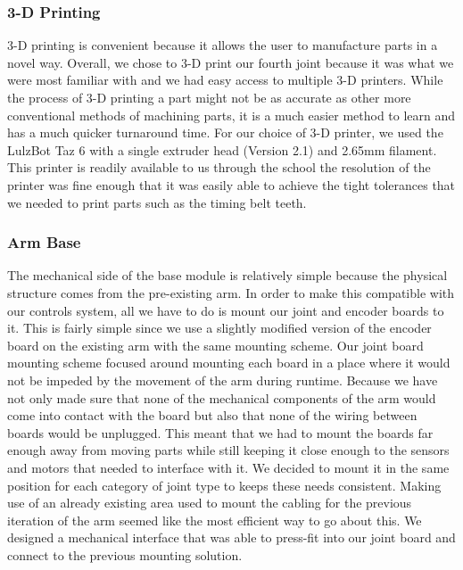 \subsubsection{3-D Printing}
3-D printing is convenient because it allows the user to manufacture parts in a novel way. Overall, we chose to 3-D print our fourth joint because it was what we were most familiar with and we had easy access to multiple 3-D printers.  While the process of 3-D printing a part might not be as accurate as other more conventional methods of machining parts, it is a much easier method to learn and has a much quicker turnaround time. For our choice of 3-D printer, we used the LulzBot Taz 6 with a single extruder head (Version 2.1) and 2.65mm filament. This printer is readily available to us through the school the resolution of the printer was fine enough that it was easily able to achieve the tight tolerances that we needed to print parts such as the timing belt teeth.    


\subsubsection{Arm Base}
The mechanical side of the base module is relatively simple because the physical structure comes from the pre-existing arm. In order to make this compatible with our controls system, all we have to do is mount our joint and encoder boards to it.  This is fairly simple since we use a slightly modified version of the encoder board on the existing arm with the same mounting scheme. Our joint board mounting scheme focused around mounting each board in a place where it would not be impeded by the movement of the arm during runtime. Because we have not only made sure that none of the mechanical components of the arm would come into contact with the board but also that none of the wiring between boards would be unplugged. This meant that we had to mount the boards far enough away from moving parts while still keeping it close enough to the sensors and motors that needed to interface with it. We decided to mount it in the same position for each category of joint type to keeps these needs consistent. Making use of an already existing area used to mount the cabling for the previous iteration of the arm seemed like the most efficient way to go about this. We designed a mechanical interface that was able to press-fit into our joint board and connect to the previous mounting solution.

